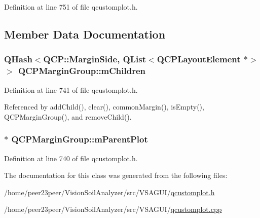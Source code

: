 Definition at line 751 of file qcustomplot.\+h.



\subsection{Member Data Documentation}
\hypertarget{class_q_c_p_margin_group_ac16957e388687100bfd10f68fb7baac8}{}
\subsubsection[{m\+Children}]{\setlength{\rightskip}{0pt plus 5cm}Q\+Hash$<${\bf Q\+C\+P\+::\+Margin\+Side}, Q\+List$<${\bf Q\+C\+P\+Layout\+Element} $\ast$$>$ $>$ Q\+C\+P\+Margin\+Group\+::m\+Children\hspace{0.3cm}{\ttfamily [protected]}}\label{class_q_c_p_margin_group_ac16957e388687100bfd10f68fb7baac8}


Definition at line 741 of file qcustomplot.\+h.



Referenced by add\+Child(), clear(), common\+Margin(), is\+Empty(), Q\+C\+P\+Margin\+Group(), and remove\+Child().

\hypertarget{class_q_c_p_margin_group_a23cfa29e3cc0f33a59141b77d8c04edf}{}
\subsubsection[{m\+Parent\+Plot}]{$\ast$ Q\+C\+P\+Margin\+Group\+::m\+Parent\+Plot\hspace{0.3cm}{\ttfamily [protected]}}\label{class_q_c_p_margin_group_a23cfa29e3cc0f33a59141b77d8c04edf}


Definition at line 740 of file qcustomplot.\+h.



The documentation for this class was generated from the following files\+:\begin{DoxyCompactItemize}
\item 
/home/peer23peer/\+Vision\+Soil\+Analyzer/src/\+V\+S\+A\+G\+U\+I/\hyperlink{qcustomplot_8h}{qcustomplot.\+h}\item 
/home/peer23peer/\+Vision\+Soil\+Analyzer/src/\+V\+S\+A\+G\+U\+I/\hyperlink{qcustomplot_8cpp}{qcustomplot.\+cpp}\end{DoxyCompactItemize}
